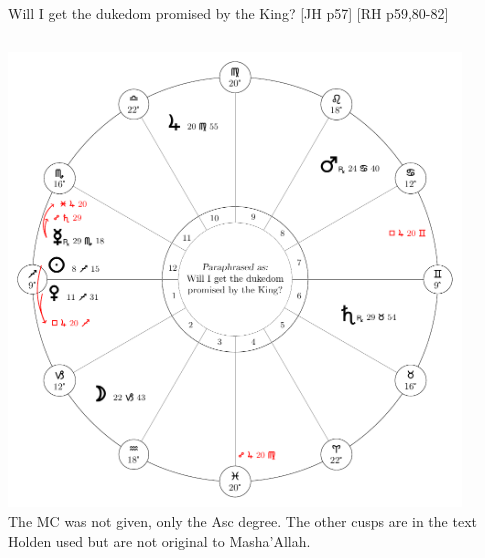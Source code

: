 \begin{frame}[t]{Will I get the dukedom promised by the King? [JH p57] [RH p59,80-82]}
\begin{columns}[T, onlytextwidth]
\begin{center}
{\includegraphics[width=0.9\textwidth]{charts/52-chart-dukedom}} \\
\scriptsize
The MC was not given, only the Asc degree. The other cusps are in the text Holden used but are not original to Masha'Allah.
\end{center}
\end{columns}

\end{frame}
